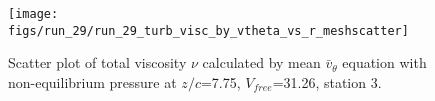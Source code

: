 \begin{figure}[H]
\centering
\texttt{[image: figs/run\_29/run\_29\_turb\_visc\_by\_vtheta\_vs\_r\_meshscatter]}
\caption{Scatter plot of total viscosity $\nu$ calculated by mean $\bar{v}_{\theta}$ equation with non-equilibrium pressure at $z/c$=7.75, $V_{free}$=31.26, station 3.}
\label{fig:run_29_turb_visc_by_vtheta_vs_r_meshscatter}
\end{figure}


